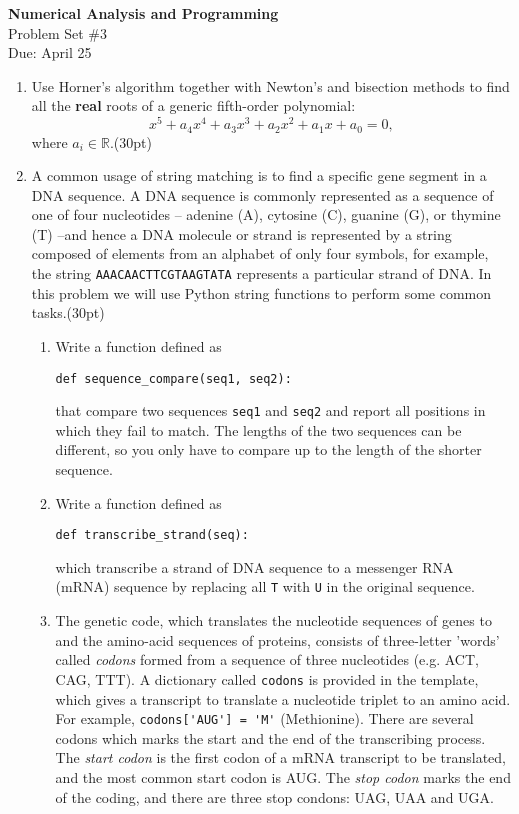 \documentclass[12pt]{article}
\begin{document}
\begin{center}
\Large
\textbf{Numerical Analysis and Programming}\\
\large
Problem Set \#3\\
Due: April 25
\end{center}

\begin{enumerate} 
\item Use Horner's algorithm together with Newton's and bisection methods  to find all  the \textbf{real} roots of a generic fifth-order polynomial:
\[
x^5+a_4x^4+a_3x^3+a_2x^2+a_1x+a_0=0,
\]
where $a_i\in \mathbb{R}$.(30pt)

\item A common usage of string matching is to find a specific gene segment in a DNA sequence. A DNA sequence is commonly represented as a sequence of one of four nucleotides – adenine (A), cytosine (C), guanine (G), or thymine (T) –and hence a DNA molecule or strand is represented by a string composed of elements from an alphabet of only four symbols, for example, the string 
\texttt{AAACAACTTCGTAAGTATA} represents a particular strand of DNA.  In this problem we will use Python string functions to perform some common tasks.(30pt)
\begin{enumerate}

\item Write a function defined as
\begin{verbatim}
def sequence_compare(seq1, seq2):
\end{verbatim}
 that compare two   sequences \verb!seq1! and \verb!seq2! and report all positions in which they fail to match. The lengths of the two sequences can be different, so you only have to compare up to the length of the shorter sequence. 
\item Write a function defined as 
\begin{verbatim}
def transcribe_strand(seq):
\end{verbatim}
which transcribe a strand of DNA sequence to a messenger RNA (mRNA) sequence by replacing all {\tt T} with {\tt U} in the original sequence. 
\item The genetic code, which translates the nucleotide sequences of genes to  and the amino-acid sequences of proteins,  consists of three-letter 'words' called \textit{codons} formed from a sequence of three nucleotides (e.g. ACT, CAG, TTT). A dictionary called \verb!codons! is provided in the template, which gives a transcript to translate a nucleotide triplet to an amino acid. For example, \verb!codons['AUG'] = 'M'! (Methionine).  There are several codons which marks the start and the end of the transcribing process. 
The \textit{start codon} is the first codon of a mRNA transcript to be translated, and the most common start codon is AUG. The \textit{stop codon} marks the end of the coding, and there are three stop condons:  UAG, UAA and UGA.


\end{enumerate}
\end{enumerate}
\end{document}
